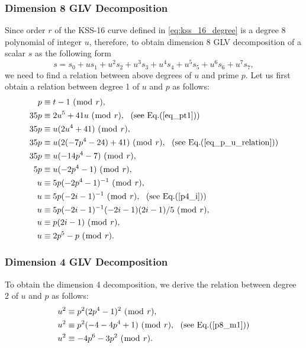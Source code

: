\subsubsection{Dimension 8 GLV Decomposition}
Since order $r$ of  the KSS-16 curve defined in \eqref{eq:kss_16_degree} is a degree 8 polynomial of integer $u$, therefore, to obtain dimension 8 GLV decomposition of a scalar $s$ as the following form
\begin{equation}
s = s_0 + u s_1 + u^2 s_2 + u^3 s_3 + u^4 s_4 + u^5 s_5 + u^6 s_6 + u^7 s_7, \nonumber
\end{equation}
we need to find a relation between above degrees of $u$ and prime $p$. 
Let us first obtain a relation between degree 1 of $u$ and $p$ as follows:
\begin{alignat}{3}
p &\equiv t-1~(\bmod~r), \nonumber \\
35p &\equiv 2u^5+41u~(\bmod~r), ~~(\text{see~Eq.}(\ref{eq_pt1}))\nonumber \\
35p &\equiv u(2u^4+41)~(\bmod~r), \nonumber \\
35p &\equiv u(2(-7p^4-24)+41)~(\bmod~r), ~~(\text{see~Eq.}(\ref{eq_p_u_relation})) \nonumber \\
35p &\equiv u(-14p^4-7)~(\bmod~r), \nonumber \\
5p &\equiv u(-2p^4-1)~(\bmod~r), \nonumber \\
u &\equiv 5p(-2p^4-1)^{-1}~(\bmod~r), \nonumber \\
u &\equiv 5p(-2i-1)^{-1}~(\bmod~r), ~~(\text{see~Eq.}(\ref{p4_i})) \nonumber \\
u &\equiv 5p(-2i-1)^{-1}(-2i-1)(2i-1)/5~(\bmod~r), \nonumber \\
u &\equiv p(2i-1)~(\bmod~r), \nonumber \\
u &\equiv 2p^5-p~(\bmod~r). \label{equ} 
\end{alignat}

\subsubsection{Dimension 4 GLV Decomposition}
To obtain the dimension 4 decomposition, we derive the relation between degree 2 of $u$ and $p$ as follows:
\begin {alignat}{3}
u^2 &\equiv p^2(2p^4-1)^2~(\bmod~r), \nonumber \\
u^2 &\equiv p^2(-4-4p^4+1)~(\bmod~r),  ~~(\text{see~Eq.}(\ref{p8_m1})) \nonumber \\
u^2 &\equiv -4p^6-3p^2~(\bmod~r). \label{equ2}
\end{alignat}


